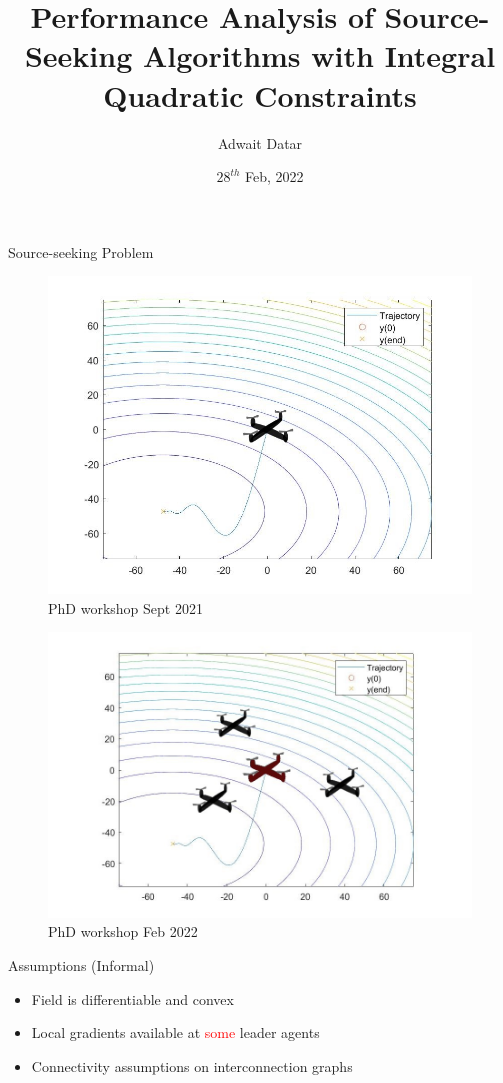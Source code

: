 \documentclass{beamer}
\title[Performance Analysis of Source-Seeking Algorithms with Integral Quadratic Constraints]{Performance Analysis of Source-Seeking Algorithms with Integral Quadratic Constraints}
\author{Adwait Datar}
\institute{PhD Workshop, 2021\\Technical University of Hamburg}
\date{$28^{th}$ Feb, 2022}
\begin{document}
\begin{frame}	
  \titlepage
\end{frame}
\begin{frame}{Source-seeking Problem}
	\begin{figure}[!htb]
		\centering
		\begin{minipage}{.5\textwidth}
			\centering
			\includegraphics[width=0.9\linewidth,height=0.45\textheight]{figures/single_quad_field.jpg}
			\label{fig:single_quad}
			PhD workshop Sept 2021
		\end{minipage}%
		\begin{minipage}{0.5\textwidth}
			\centering
			\includegraphics[width=0.9\linewidth,height=0.45\textheight]{figures/multiple_quad_field.jpg}
			\label{fig:multiple_quads}
			PhD workshop Feb 2022
		\end{minipage}
		\end{figure}
	\begin{block}{Assumptions (Informal)}
		\begin{itemize}		
			\item Field is differentiable and convex
			\item Local gradients available at \textcolor{red}{some} leader agents 
			\item Connectivity assumptions on interconnection graphs
		\end{itemize}		
	\end{block}
\end{frame}
\end{document}
